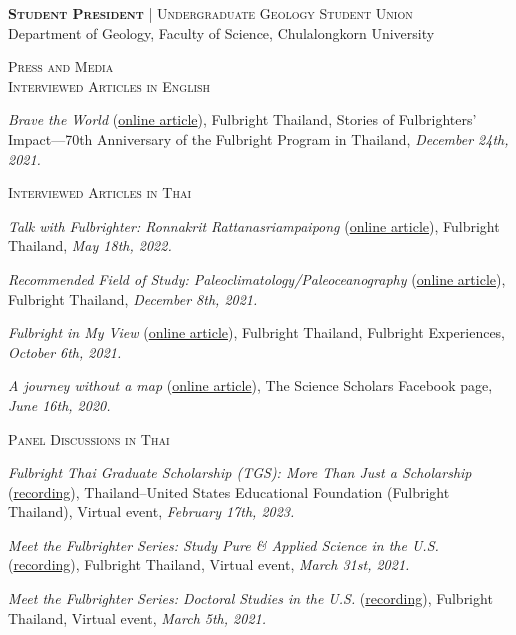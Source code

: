 \documentclass[11pt, letter]{article}
\newcommand{\margintext}[1]{\marginnote{\normalsize\textbf #1 |}}
\begin{document}
\bigskip
\textsc{\textbf{Student President}} | \textsc{Undergraduate Geology Student Union} \\
Department of Geology, Faculty of Science, Chulalongkorn University

\bigskip
\margintext{Outreach}
\textsc{Press and Media}\\
\textsc{Interviewed Articles in English}
\begin{etaremune}
\item \textit{Brave the World} (\href{https://issuu.com/fulbrightthailand/docs/storeis_fo_fulbrighters_impact}{online article}), Fulbright Thailand, Stories of Fulbrighters’ Impact—70th Anniversary of the Fulbright Program in Thailand, \textit{December 24th, 2021.}
\end{etaremune}

\textsc{Interviewed Articles in Thai}
\begin{etaremune}
\item \textit{Talk with Fulbrighter: Ronnakrit Rattanasriampaipong} (\href{https://www.fulbrightthai.org/fulbright-stories/khuykab-fulbrighter-rnkrsdi-ratnsrii-amaiphphngs}{online article}), Fulbright Thailand, \textit{May 18th, 2022.}
\item \textit{Recommended Field of Study: Paleoclimatology/Paleoceanography} (\href{https://www.fulbrightthai.org/knowledge-sharing/saakhaa-yaakaenanam-1-paleoclimatology-paleoceanography}{online article}), Fulbright Thailand, \textit{December 8th, 2021.}
\item \textit{Fulbright in My View} (\href{https://anyflip.com/afeb/buat/?fbclid=IwAR08dv9XF7UCimtM9SjwICdCSwSQfuTHNtPbbaepT4WZlTcNRXB9eNtUsi8}{online article}), Fulbright Thailand, Fulbright Experiences, \textit{October 6th, 2021.}
\item \textit{A journey without a map} (\href{https://www.facebook.com/ThaiScienceScholars/photos/a.114754726700839/170670231109288/?type=3}{online article}), The Science Scholars Facebook page, \textit{June 16th, 2020.}
\end{etaremune}

\textsc{Panel Discussions in Thai}
\begin{etaremune}
\item \textit{Fulbright Thai Graduate Scholarship (TGS): More Than Just a Scholarship} (\href{https://fb.watch/iLwkVkeNjJ/}{recording}), Thailand–United States Educational Foundation (Fulbright Thailand), Virtual event, \textit{February 17th, 2023.}
\item \textit{Meet the Fulbrighter Series: Study Pure \& Applied Science in the U.S.} (\href{https://www.facebook.com/watch/?v=192470062421053}{recording}), Fulbright Thailand, Virtual event, \textit{March 31st, 2021.}
\item \textit{Meet the Fulbrighter Series: Doctoral Studies in the U.S.} (\href{https://www.facebook.com/watch/?v=1018096972055863}{recording}), Fulbright Thailand, Virtual event,\textit{ March 5th, 2021.} 

\end{etaremune}


\end{document}
